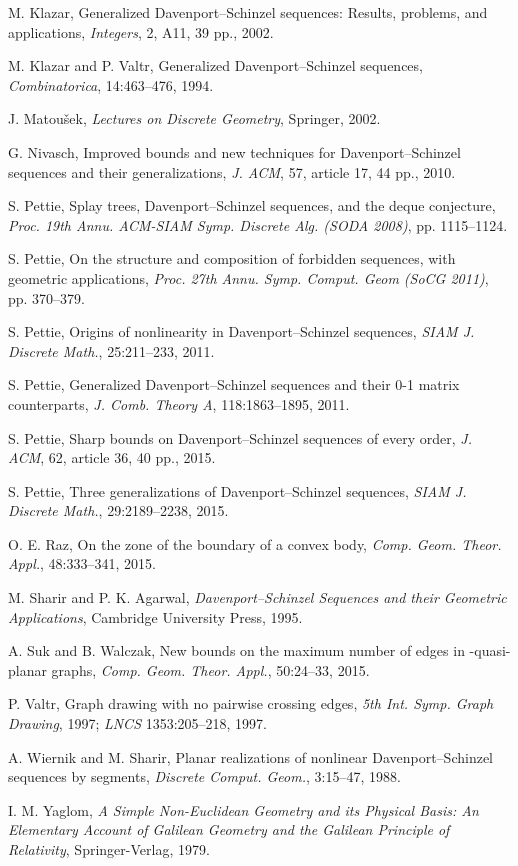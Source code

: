 \documentclass[11pt]{article}
\theoremstyle{definition}
\theoremstyle{remark}
\begin{document}
\begin{thebibliography}{99}
M. Klazar, Generalized Davenport--Schinzel sequences: Results, problems, and applications, \emph{Integers}, 2, A11, 39 pp., 2002.

M. Klazar and P. Valtr, Generalized Davenport--Schinzel sequences, \emph{Combinatorica}, 14:463--476, 1994.

J. Matou\v sek, \emph{Lectures on Discrete Geometry}, Springer, 2002.

G. Nivasch, Improved bounds and new techniques for Davenport--Schinzel sequences and their generalizations, \emph{J. ACM}, 57, article 17, 44 pp., 2010.

S. Pettie, Splay trees, Davenport--Schinzel sequences, and the deque conjecture, \emph{Proc. 19th Annu. ACM-SIAM Symp. Discrete Alg. (SODA 2008)}, pp. 1115--1124.

S. Pettie, On the structure and composition of forbidden sequences, with geometric applications, \emph{Proc. 27th Annu. Symp. Comput. Geom (SoCG 2011)}, pp. 370--379.

S. Pettie, Origins of nonlinearity in Davenport--Schinzel sequences, \emph{SIAM J. Discrete Math.}, 25:211--233, 2011.

S. Pettie, Generalized Davenport--Schinzel sequences and their 0-1 matrix counterparts, \emph{J. Comb. Theory A}, 118:1863--1895, 2011.

S. Pettie, Sharp bounds on Davenport--Schinzel sequences of every order, \emph{J. ACM}, 62, article 36, 40 pp., 2015.

S. Pettie, Three generalizations of Davenport--Schinzel sequences, \emph{SIAM J. Discrete Math.}, 29:2189--2238, 2015.

O. E. Raz, On the zone of the boundary of a convex body, \emph{Comp. Geom. Theor. Appl.}, 48:333--341, 2015.

M. Sharir and P. K. Agarwal, \emph{Davenport--Schinzel Sequences and their Geometric Applications}, Cambridge University Press, 1995.

A. Suk and B. Walczak, New bounds on the maximum number of edges in -quasi-planar graphs, \emph{Comp. Geom. Theor. Appl.}, 50:24--33, 2015.

P. Valtr, Graph drawing with no  pairwise crossing edges, \emph{5th Int. Symp. Graph Drawing}, 1997; \emph{LNCS} 1353:205--218, 1997.

A. Wiernik and M. Sharir, Planar realizations of nonlinear Davenport--Schinzel sequences by segments, \emph{Discrete Comput. Geom.}, 3:15--47, 1988.

I. M. Yaglom, \emph{A Simple Non-Euclidean Geometry and its Physical Basis: An Elementary Account of Galilean Geometry and the Galilean Principle of Relativity}, Springer-Verlag, 1979.
\end{thebibliography}
\end{document}
